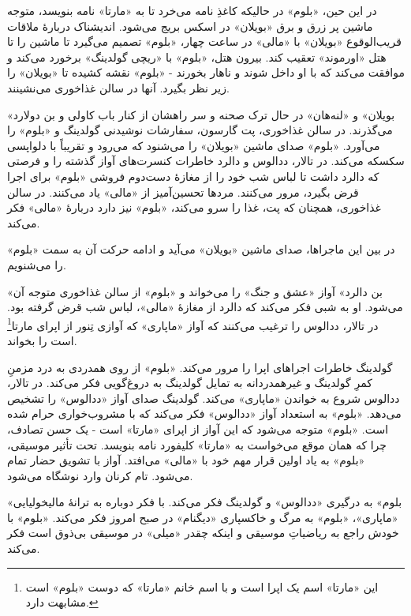 \documentclass[12pt]{book}
\newcommand{\noun}[1]{«{#1}»}
\begin{document}
    در این حین، \noun{بلوم} در حالیکه کاغذِ نامه می‌خرد تا به \noun{مارتا} نامه بنویسد، متوجه ماشین پر زرق و برق \noun{بویلان} در اسکس بریج می‌شود. اندیشناک دربارۀ ملاقات قریب‌الوقوع \noun{بویلان} با \noun{مالی} در ساعت چهار، \noun{بلوم} تصمیم می‌گیرد تا ماشین را تا هتل \noun{اورموند} تعقیب کند. بیرون هتل، \noun{بلوم} با \noun{ریچی گولدینگ} برخورد می‌کند و موافقت می‌کند که با او داخل شوند و ناهار بخورند - \noun{بلوم} نقشه کشیده تا \noun{بویلان} را زیر نظر بگیرد. آنها در سالن غذاخوری می‌نشینند.

    \noun{بویلان} و \noun{لنه‌هان} در حال ترک صحنه و سر راهشان از کنار باب کاولی و بن دولارد می‌گذرند. در سالن غذاخوری، پت گارسون، سفارشات نوشیدنی گولدینگ و \noun{بلوم} را می‌آورد. \noun{بلوم} صدای ماشین \noun{بویلان} را می‌شنود که می‌رود و تقریباً با دلواپسی سکسکه می‌کند. در تالار، ددالوس و دالرد خاطرات کنسرت‌های آواز گذشته را و فرصتی که دالرد داشت تا لباس شب خود را از مغازۀ دست‌دوم فروشی \noun{بلوم} برای اجرا قرض بگیرد، مرور می‌کنند. مردها تحسین‌آمیز از \noun{مالی} یاد می‌کنند. در سالن غذاخوری، همچنان که پت، غذا را سرو می‌کند، \noun{بلوم} نیز دارد دربارۀ \noun{مالی} فکر می‌کند.

    در بین این ماجراها، صدای ماشین \noun{بویلان} می‌آید و ادامه حرکت آن به سمت \noun{بلوم} را می‌شنویم.

    \noun{بن دالرد}  آواز «عشق و جنگ» را می‌خواند و \noun{بلوم} از سالن غذاخوری متوجه آن می‌شود. او به شبی فکر می‌کند که دالرد از مغازۀ \noun{مالی}، لباس شب قرض گرفته بود. در تالار، ددالوس را ترغیب می‌کنند که آواز «ماپاری» که آوازی تِنور از اپرای مارتا\footnote{این «مارتا» اسم یک اپرا است و با اسم خانم \noun{مارتا} که دوست \noun{بلوم} است مشابهت دارد.} است را بخواند.

    گولدینگ خاطرات اجراهای اپرا را مرور می‌کند. \noun{بلوم} از روی همدردی به درد مزمنِ کمرِ گولدینگ و غیرهمدردانه به تمایل گولدینگ به دروغ‌گویی فکر می‌کند. در تالار، ددالوس شروع به خواندن «ماپاری» می‌کند. گولدینگ صدای آواز \noun{ددالوس} را تشخیص می‌دهد. \noun{بلوم} به استعداد آواز \noun{ددالوس} فکر می‌کند که با مشروب‌خواری حرام شده است. \noun{بلوم} متوجه می‌شود که این آواز از اپرای \noun{مارتا} است - یک حسن تصادف، چرا که همان موقع می‌خواست به \noun{مارتا} کلیفورد نامه بنویسد. تحت تأثیر موسیقی، \noun{بلوم} به یاد اولین قرار مهم خود با \noun{مالی} می‌افتد. آواز با تشویق حضار تمام می‌شود. تام کرنان وارد نوشگاه می‌شود.

    \noun{بلوم} به درگیری \noun{ددالوس} و گولدینگ فکر می‌کند. با فکر دوباره به ترانۀ مالیخولیایی «ماپاری»، \noun{بلوم} به مرگ و خاکسپاری \noun{دیگنام} در صبح امروز فکر می‌کند. \noun{بلوم} با خودش راجع به ریاضیاتِ موسیقی و اینکه چقدر \noun{میلی} در موسیقی بی‌ذوق است فکر می‌کند.
\end{document}
